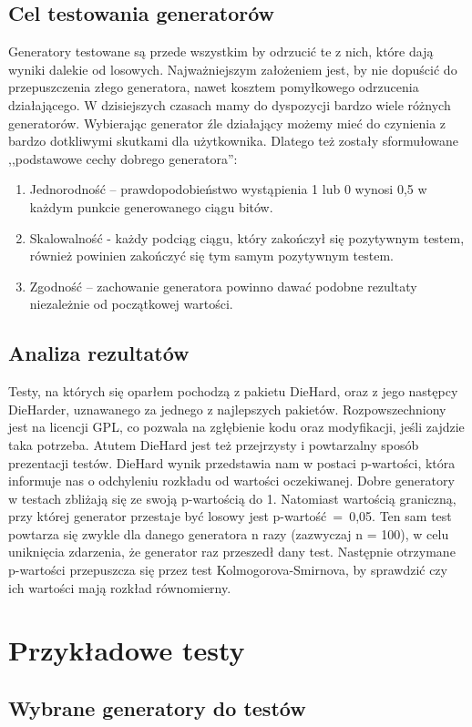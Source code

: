 \documentclass[11pt]{aghdpl}
\begin{document}
\subsection{Cel testowania generatorów}
Generatory testowane są przede wszystkim by odrzucić te z nich, które dają wyniki dalekie od losowych. Najważniejszym założeniem jest, by nie dopuścić do przepuszczenia złego generatora, nawet kosztem pomyłkowego odrzucenia działającego. W dzisiejszych czasach mamy do dyspozycji bardzo wiele różnych generatorów. Wybierając generator źle działający możemy mieć do czynienia z bardzo dotkliwymi skutkami dla użytkownika. Dlatego też zostały sformułowane ,,podstawowe cechy dobrego generatora'':
\begin{enumerate}
\item Jednorodność – prawdopodobieństwo wystąpienia 1 lub 0 wynosi 0,5 w każdym punkcie generowanego ciągu bitów.
\item Skalowalność - każdy podciąg ciągu, który zakończył się pozytywnym testem, również powinien zakończyć się tym samym pozytywnym testem.
\item Zgodność – zachowanie generatora powinno dawać podobne rezultaty niezależnie od początkowej wartości.
\end{enumerate}
\subsection{Analiza rezultatów}
Testy, na których się oparłem pochodzą z pakietu DieHard, oraz z jego następcy DieHarder, uznawanego za jednego z najlepszych pakietów. Rozpowszechniony jest na licencji GPL, co pozwala na zgłębienie kodu oraz modyfikacji, jeśli zajdzie taka potrzeba. Atutem DieHard jest też przejrzysty i powtarzalny sposób prezentacji testów. DieHard wynik przedstawia nam w postaci p-wartości, która informuje nas o odchyleniu rozkładu od wartości oczekiwanej. Dobre generatory w testach zbliżają się ze swoją p-wartością do 1. Natomiast wartością graniczną, przy której generator przestaje być losowy jest p-wartość~=~0,05. 
Ten sam test powtarza się zwykle dla danego generatora n razy (zazwyczaj n = 100), w celu uniknięcia zdarzenia, że generator raz przeszedł dany test. Następnie otrzymane p-wartości przepuszcza się przez test Kolmogorova-Smirnova, by sprawdzić czy ich wartości mają rozkład równomierny.
\section{Przykładowe testy}
\subsection{Wybrane generatory do testów}
\end{document}
